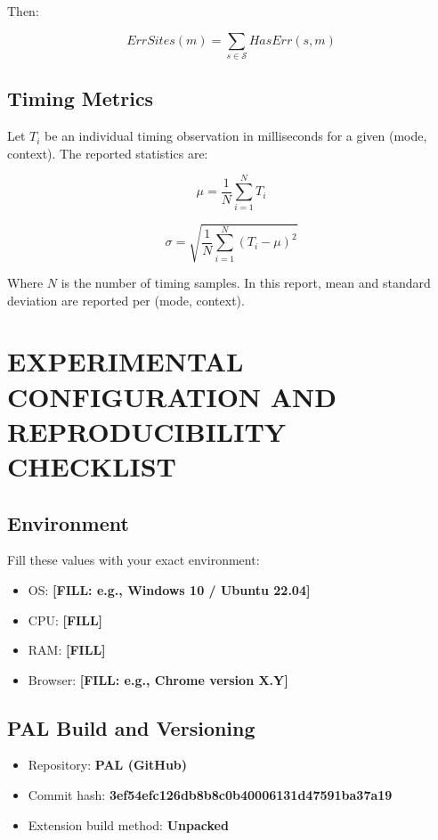 \documentclass[11pt]{report}
\begin{document}
Then:

\[
ErrSites(m) = \sum_{s\in\mathcal{S}} HasErr(s,m)
\]

\section{Timing Metrics}

Let $T_{i}$ be an individual timing observation in milliseconds for a given (mode, context). The reported statistics are:

\[
\mu = \frac{1}{N}\sum_{i=1}^{N} T_i
\]

\[
\sigma = \sqrt{\frac{1}{N}\sum_{i=1}^{N} (T_i - \mu)^2}
\]

Where $N$ is the number of timing samples. In this report, mean and standard deviation are reported per (mode, context).



\chapter{EXPERIMENTAL CONFIGURATION AND REPRODUCIBILITY CHECKLIST}

\section{Environment}

Fill these values with your exact environment:

\begin{itemize}
    \item OS: \textbf{[FILL: e.g., Windows 10 / Ubuntu 22.04]}
    \item CPU: \textbf{[FILL]}
    \item RAM: \textbf{[FILL]}
    \item Browser: \textbf{[FILL: e.g., Chrome version X.Y]}
\end{itemize}

\section{PAL Build and Versioning}

\begin{itemize}
    \item Repository: \textbf{PAL (GitHub)}
    \item Commit hash: \textbf{3ef54efc126db8b8c0b40006131d47591ba37a19}
    \item Extension build method: \textbf{Unpacked}
\end{itemize}
\end{document}
